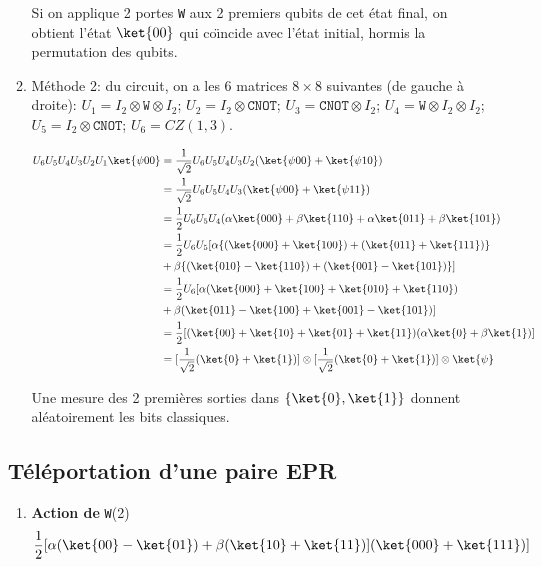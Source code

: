 \begin{enumerate}
\begin{enumerate}
\begin{remark}
Si on applique 2 portes \texttt{W} aux 2 premiers qubits de cet état final, on
obtient l'état $\ket{00}$ qui co\"{\i}ncide avec l'état initial, hormis la
permutation des qubits.
\end{remark}

\item Méthode 2: du circuit, on a les 6 matrices $8\times8$ suivantes (de gauche
à droite):
$U_1=I_2\otimes \mathtt{W}\otimes I_2$; $U_2=I_2\otimes \mathtt{CNOT}$;
$U_3=\mathtt{CNOT}\otimes I_2$; $U_4=\mathtt{W}\otimes I_2\otimes I_2$;
$U_{5}=I_2\otimes \mathtt{CNOT}$; $U_{6}=CZ(1,3).$%

\begin{equation}
	\begin{split}
U_{6}U_{5}U_4U_3U_2U_1\ket{\psi00} &  =\frac
{1}{\sqrt{2}}U_{6}U_{5}U_4U_3U_2(\ket{\psi00}+\ket{\psi10}) \\
&  =\frac{1}{\sqrt{2}}U_{6}U_{5}U_4U_3(\ket{\psi00}+\ket{\psi11}) \\
&  =\frac{1}{2}U_{6}U_{5}U_4(\alpha\ket{000}+\beta\ket{110} +\alpha\ket{011}
+\beta\ket{101}) \\
&  =\frac{1}{2}U_{6}U_{5}[\alpha\{(\ket{000}+\ket{100})+(\ket{011}+\ket{111})\} \\
&  +\beta\{(\ket{010} -\ket{110})+(\ket{001} -\ket{101})\}]\\
&  =\frac{1}{2}U_{6}[\alpha(\ket{000} +\ket{100}+\ket{010} +\ket{110}) \\
&  +\beta(\ket{011} -\ket{100}+\ket{001}-\ket{101})]\\
&  =\frac{1}{2}[(\ket{00}+\ket{10}+\ket{01}+\ket{11})(\alpha\ket{0} +\beta
\ket{1})] \\
&  =[\frac{1}{\sqrt{2}}(\ket{0} +\ket{1})]\otimes[\frac{1}{\sqrt{2}}
(\ket{0} +\ket{1})]\otimes\ket{\psi}
\end{split}
\end{equation}

Une mesure des 2 premières sorties dans $\{\ket{0},\ket{1} \}$ donnent
aléatoirement les bits classiques.

\end{enumerate}

\subsection{Téléportation d'une paire EPR}

\begin{enumerate}
\item \textbf{Action de} \texttt{W}(2)
\begin{equation}
	\frac{1}{2}[\alpha(\ket{00}-\ket{01})+\beta(\ket{10} +\ket{11})]
(\ket{000}+\ket{111})]
\end{equation}


\end{enumerate}
\end{enumerate}
